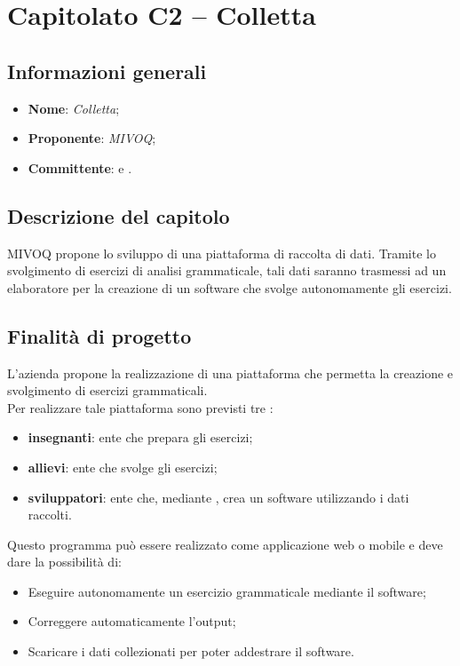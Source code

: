 \section{Capitolato C2 – Colletta}

\subsection{Informazioni generali}

\begin{itemize}
\item \textbf{Nome}: \textit{Colletta};\phantom{.}
\item \textbf{Proponente}: \textit{MIVOQ};\phantom{.}
\item \textbf{Committente}: \commitNameM\mbox{} e \commitNameS.
\end{itemize}

\subsection{Descrizione del capitolo}
MIVOQ propone lo sviluppo di una piattaforma di raccolta di dati. Tramite lo svolgimento di esercizi di analisi grammaticale, tali dati saranno trasmessi ad un elaboratore per la creazione di un software che svolge autonomamente gli esercizi.

\subsection{Finalità di progetto}
L'azienda propone la realizzazione di una piattaforma che permetta la creazione e svolgimento di esercizi grammaticali.
\\
Per realizzare tale piattaforma sono previsti tre :
\begin{itemize}
    \item \textbf{insegnanti}: ente che prepara gli esercizi;
    \item \textbf{allievi}: ente che svolge gli esercizi;
    \item \textbf{sviluppatori}: ente che, mediante , crea un software utilizzando i dati raccolti.
\end{itemize}
Questo programma può essere realizzato come applicazione web o mobile e deve dare la possibilità di:
\begin{itemize}
    \item Eseguire autonomamente un esercizio grammaticale mediante il software;
    \item Correggere automaticamente l’output;
    \item Scaricare i dati collezionati per poter addestrare il software.
\end{itemize}

